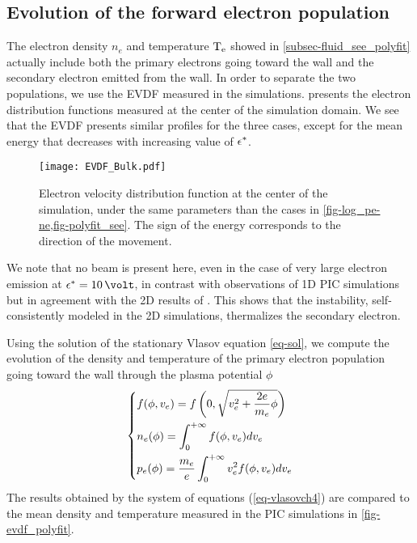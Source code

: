 \subsection{Evolution of the forward electron population} \label{subsec-EVDF_see_polyfit}

The electron density $n_e$ and  temperature $\mathrm{T_e}$ showed in \cref{subsec-fluid_see_polyfit} actually include both the primary electrons going toward the wall and the secondary electron emitted from the wall.
In order to separate the two populations, we use the \ac{EVDF} measured in the simulations.
 presents the electron distribution functions measured at the center of the simulation domain. 
We see that the \ac{EVDF} presents similar profiles for the three cases, except for the mean energy that decreases with increasing value of $\epsilon^{*}$.

\begin{figure}[!hbt]
  \centering
  \texttt{[image: EVDF\_Bulk.pdf]}
  \caption{Electron velocity distribution function at the center of the simulation, under the same parameters than the cases in \cref{fig-log_pe-ne,fig-polyfit_see}. The sign of the energy corresponds to the direction of the movement.}
  \label{fig-evdf_epsstar}
\end{figure}


We note that no beam is present here, even in the case of very large electron emission at $\crover=10\,\volt$, in contrast with observations of \ac{1D} PIC simulations \citep{sydorenko2006b,sydorenko2007} but in agreement with the \ac{2D} results of \citet{heron2013}.
This shows that the instability, self-consistently modeled in the \ac{2D} simulations, thermalizes the secondary electron.

Using the solution of the stationary Vlasov equation \cref{eq-sol}, we compute the evolution of the density and temperature of the primary electron population going toward the wall through the plasma potential $\phi$ 
\begin{equation} \label{eq-vlasovch4}
  \begin{dcases}
    f(\phi, v_e) = f \left( 0, \sqrt{v_e^2 + \frac{2 e}{m_e} \phi} \right) \\
    n_e(\phi) = \int_0^{+\infty} f(\phi, v_e) dv_e \\
    p_e(\phi) = \frac{m_e}{e} \int_0^{+\infty} v_e^2 f(\phi, v_e) dv_e \\
  \end{dcases}
\end{equation}
The results obtained by the system of equations (\ref{eq-vlasovch4}) are compared to the mean density and temperature measured in the \ac{PIC} simulations in \cref{fig-evdf_polyfit}.

